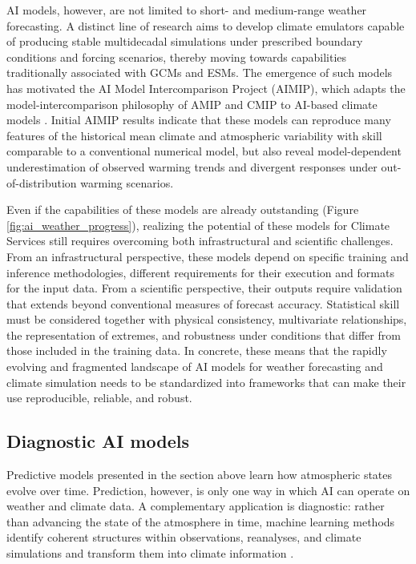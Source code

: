AI models, however, are not limited to short- and medium-range weather forecasting. A distinct line of research aims to develop climate emulators capable of producing stable multidecadal simulations under prescribed boundary conditions and forcing scenarios, thereby moving towards capabilities traditionally associated with GCMs and ESMs. The emergence of such models has motivated the AI Model Intercomparison Project (AIMIP), which adapts the model-intercomparison philosophy of AMIP and CMIP to AI-based climate models \citep{henn_aimip_2026}. Initial AIMIP results indicate that these models can reproduce many features of the historical mean climate and atmospheric variability with skill comparable to a conventional numerical model, but also reveal model-dependent underestimation of observed warming trends and divergent responses under out-of-distribution warming scenarios.

Even if the capabilities of these models are already outstanding (Figure \ref{fig:ai_weather_progress}), realizing the potential of these models for Climate Services still requires overcoming both infrastructural and scientific challenges. From an infrastructural perspective, these models depend on specific training and inference methodologies, different requirements for their execution and formats for the input data. From a scientific perspective, their outputs require validation that extends beyond conventional measures of forecast accuracy. Statistical skill must be considered together with physical consistency, multivariate relationships, the representation of extremes, and robustness under conditions that differ from those included in the training data. In concrete, these means that the rapidly evolving and fragmented landscape of AI models for weather forecasting and climate simulation needs to be standardized into frameworks that can make their use reproducible, reliable, and robust.


\subsection{Diagnostic AI models}

Predictive models presented in the section above learn how atmospheric states evolve over time. Prediction, however, is only one way in which AI can operate on weather and climate data. A complementary application is diagnostic: rather than advancing the state of the atmosphere in time, machine learning methods identify coherent structures within observations, reanalyses, and climate simulations and transform them into climate information \citep{schneider_esa-ecmwf_2022}.

